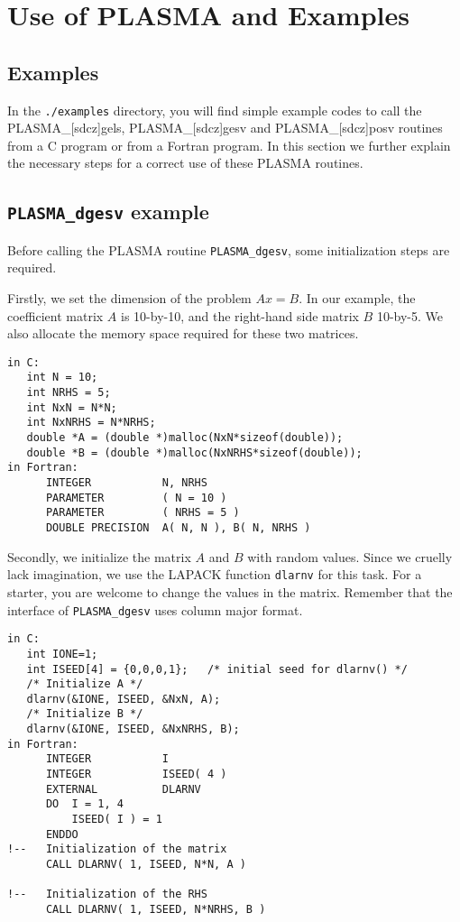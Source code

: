 
\chapter{Use of PLASMA and Examples}

\section{Examples}
In the \texttt{./examples} directory, you will find simple example codes to call
the PLASMA\_[sdcz]gels, PLASMA\_[sdcz]gesv and PLASMA\_[sdcz]posv routines from
a C program or from a Fortran program.  In this section we further explain the necessary
steps for a correct use of these PLASMA routines.

\section{\texttt{PLASMA\_dgesv} example}

Before calling the PLASMA routine \texttt{PLASMA\_dgesv}, some initialization steps 
are required.

Firstly, we set the dimension of the problem $Ax=B$.  In our example, the
coefficient matrix $A$ is 10-by-10, and the right-hand side matrix $B$ 10-by-5.
We also allocate the memory space required for these two matrices.
\begin{verbatim}
in C:
   int N = 10;
   int NRHS = 5;
   int NxN = N*N;
   int NxNRHS = N*NRHS;
   double *A = (double *)malloc(NxN*sizeof(double));
   double *B = (double *)malloc(NxNRHS*sizeof(double));
in Fortran:
      INTEGER           N, NRHS
      PARAMETER         ( N = 10 )
      PARAMETER         ( NRHS = 5 )
      DOUBLE PRECISION  A( N, N ), B( N, NRHS )
\end{verbatim}

Secondly, we initialize the matrix $A$ and $B$ with random values.  Since we
cruelly lack imagination, we use the LAPACK function \texttt{dlarnv} for this
task.  For a starter, you are welcome to change the values in the matrix.
Remember that the interface of \texttt{PLASMA\_dgesv} uses column major format.
\begin{verbatim}
in C:
   int IONE=1;
   int ISEED[4] = {0,0,0,1};   /* initial seed for dlarnv() */
   /* Initialize A */
   dlarnv(&IONE, ISEED, &NxN, A);
   /* Initialize B */
   dlarnv(&IONE, ISEED, &NxNRHS, B);
in Fortran:
      INTEGER           I
      INTEGER           ISEED( 4 )
      EXTERNAL          DLARNV
      DO  I = 1, 4
          ISEED( I ) = 1
      ENDDO
!--   Initialization of the matrix
      CALL DLARNV( 1, ISEED, N*N, A )

!--   Initialization of the RHS
      CALL DLARNV( 1, ISEED, N*NRHS, B )
\end{verbatim}

